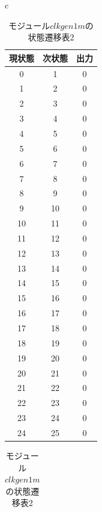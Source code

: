 \documentclass[a4paper]{jarticle}
\begin{document}
\begin{table}[!h]
	\begin{center}
		\begin{tabular}{c}
			\begin{minipage}{0.5\hsize}
				\begin{center}
					\caption{モジュール$clkgen1m$の状態遷移表1}
					\label{Work18StateTransitionTable1}
					\begin{tabular}{|c|c|c|}
					\hline
					現状態	&次状態	&出力\\	\hline\hline
					0	&1	&0\\	\hline
					1	&2	&0\\	\hline
					2	&3	&0\\	\hline
					3	&4	&0\\	\hline
					4	&5	&0\\	\hline
					5	&6	&0\\	\hline
					6	&7	&0\\	\hline
					7	&8	&0\\	\hline
					8	&9	&0\\	\hline
					9	&10	&0\\	\hline
					10	&11	&0\\	\hline
					11	&12	&0\\	\hline
					12	&13	&0\\	\hline
					13	&14	&0\\	\hline
					14	&15	&0\\	\hline
					15	&16	&0\\	\hline
					16	&17	&0\\	\hline
					17	&18	&0\\	\hline
					18	&19	&0\\	\hline
					19	&20	&0\\	\hline
					20	&21	&0\\	\hline
					21	&22	&0\\	\hline
					22	&23	&0\\	\hline
					23	&24	&0\\	\hline
					24	&25	&0\\	\hline
					\end{tabular}
				\end{center}
			\end{minipage}
			\begin{minipage}{0.5\hsize}
				\begin{center}
					\caption{モジュール$clkgen1m$の状態遷移表2}
					\label{Work18StateTransitionTable2}
					\begin{tabular}{|c|c|c|}

\end{tabular}
\end{center}
\end{minipage}
\end{tabular}
\end{center}
\end{table}
\end{document}
